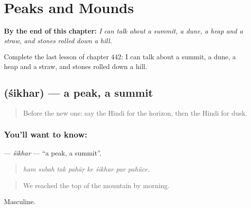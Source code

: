 
\chapter{Peaks and Mounds}
\label{ch:hi-peaks-and-mounds}

\begin{chapteropening}
\textbf{By the end of this chapter:} \emph{I can talk about a summit, a dune, a heap and a straw, and stones rolled down a hill.}

Complete the last lesson of chapter 442: I can talk about a summit, a dune, a heap and a straw, and stones rolled down a hill.
\end{chapteropening}

\section[\texorpdfstring{\hi{शिखर} (śikhar)}{शिखर (śikhar)}]{ (śikhar) — a peak, a summit}

\label{lesson:HI-C442-sikhar}



\begin{quote}
Before the new one: say the Hindi for the horizon, then the Hindi for dusk.
\end{quote}

\subsection*{You'll want to know: }
\textbf{} — \emph{śikhar} — \textquotedblleft{}a peak, a summit\textquotedblright{}.

\begin{quote}
       
\end{quote}

\begin{quote}
\emph{ham subah tak pahāṛ ke śikhar par pahũce.}
\end{quote}

\begin{quote}
We reached the top of the mountain by morning.
\end{quote}

Masculine.

